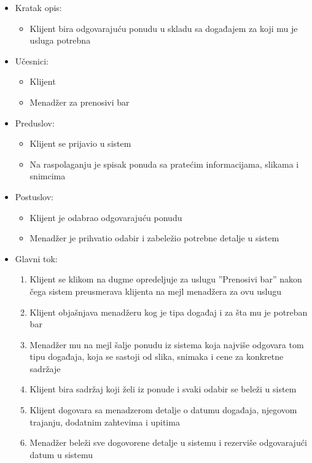 \documentclass[a4paper]{article}
\begin{document}
\begin{itemize}
    \item Kratak opis:
        \begin{itemize}
            \item Klijent bira odgovarajuću ponudu u skladu sa događajem za koji mu je usluga potrebna
        \end{itemize}
    \item Učesnici:
        \begin{itemize}
            \item Klijent
            \item Menadžer za prenosivi bar
        \end{itemize}
    \item Preduslov:
        \begin{itemize}
            \item Klijent se prijavio u sistem
		    \item Na raspolaganju je spisak ponuda sa pratećim informacijama, slikama i snimcima
        \end{itemize}
    \item Postuslov:
        \begin{itemize}
            \item Klijent je odabrao odgovarajuću ponudu
            \item Menadžer je prihvatio odabir i zabeležio potrebne detalje u sistem
        \end{itemize}
    \item Glavni tok:
        \begin{enumerate}
		    \item Klijent se klikom na dugme opredeljuje za uslugu ''Prenosivi bar'' nakon čega sistem preusmerava klijenta na mejl menadžera za ovu uslugu
		    \item Klijent objašnjava menadžeru kog je tipa događaj i za šta mu je potreban bar
		    \item Menadžer mu na mejl šalje ponudu iz  sistema koja najviše odgovara tom tipu događaja, koja se sastoji od slika, snimaka i cene za konkretne sadržaje
		    \item Klijent bira sadržaj koji želi iz ponude i svaki odabir se beleži u sistem
		    \item Klijent dogovara sa menadzerom detalje o datumu događaja, njegovom trajanju, dodatnim zahtevima i upitima
		    \item Menadžer beleži sve dogovorene detalje u sistemu i rezerviše odgovarajući datum u sistemu

\end{enumerate}
\end{itemize}
\end{document}

